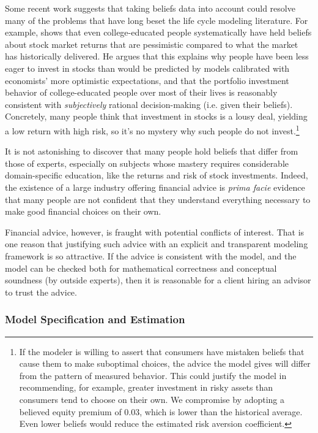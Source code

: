 \documentclass{article}
\begin{document}
Some recent work suggests that taking beliefs data into account could resolve many of the problems that have long beset the life cycle modeling literature.
For example, \cite{velasquezgiraldoJMP} shows that even college-educated people systematically have held beliefs about stock market returns that are pessimistic compared to what the market has historically delivered.
He argues that this explains why people have been less eager to invest in stocks than would be predicted by models calibrated with economists' more optimistic expectations, and that the portfolio investment behavior of college-educated people over most of their lives is reasonably consistent with \textit{subjectively} rational decision-making (i.e. given their beliefs).
Concretely, many people think that investment in stocks is a lousy deal, yielding a low return with high risk, so it's no mystery why such people do not invest.\footnote{If the modeler is willing to assert that consumers have mistaken beliefs that cause them to make suboptimal choices, the advice the model gives will differ from the pattern of measured behavior. This could justify the model in recommending, for example, greater investment in risky assets than consumers tend to choose on their own. We compromise by adopting a believed equity premium of 0.03, which is lower than the historical average. Even lower beliefs would reduce the estimated risk aversion coefficient.}

It is not astonishing to discover that many people hold beliefs that differ from those of experts, especially on subjects whose mastery requires considerable domain-specific education, like the returns and risk of stock investments.
Indeed, the existence of a large industry offering financial advice is \textit{prima facie} evidence that many people are not confident that they understand everything necessary to make good financial choices on their own.

Financial advice, however, is fraught with potential conflicts of interest.
That is one reason that justifying such advice with an explicit and transparent modeling framework is so attractive.
If the advice is consistent with the model, and the model can be checked both for mathematical correctness and conceptual soundness (by outside experts), then it is reasonable for a client hiring an advisor to trust the advice.

\subsubsection{Model Specification and Estimation}
\end{document}
